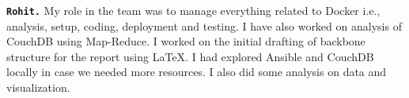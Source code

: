 \textbf{\texttt{Rohit.} }
My role in the team was to manage everything related to Docker i.e., analysis, setup, coding, deployment and testing. I have also worked on analysis of CouchDB using Map-Reduce. I worked on the initial drafting of backbone structure for the report using \LaTeX. I had explored Ansible and CouchDB locally in case we needed more resources. I also did some analysis on data and visualization.